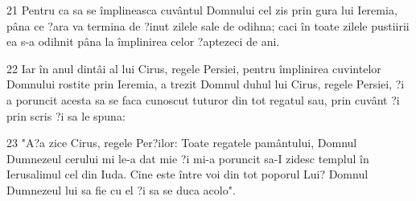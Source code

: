 \par 21 Pentru ca sa se împlineasca cuvântul Domnului cel zis prin gura lui Ieremia, pâna ce ?ara va termina de ?inut zilele sale de odihna; caci în toate zilele pustiirii ea s-a odihnit pâna la împlinirea celor ?aptezeci de ani.
\par 22 Iar în anul dintâi al lui Cirus, regele Persiei, pentru împlinirea cuvintelor Domnului rostite prin Ieremia, a trezit Domnul duhul lui Cirus, regele Persiei, ?i a poruncit acesta sa se faca cunoscut tuturor din tot regatul sau, prin cuvânt ?i prin scris ?i sa le spuna:
\par 23 "A?a zice Cirus, regele Per?ilor: Toate regatele pamântului, Domnul Dumnezeul cerului mi le-a dat mie ?i mi-a poruncit sa-I zidesc templul în Ierusalimul cel din Iuda. Cine este între voi din tot poporul Lui? Domnul Dumnezeul lui sa fie cu el ?i sa se duca acolo".


